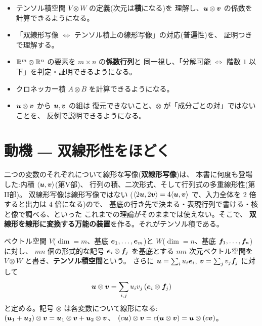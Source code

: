 \begin{goal}
\begin{itemize}
\item テンソル積空間 $V \otimes W$ の定義(次元は\textbf{積}になる)を
理解し、$\bm{u} \otimes \bm{v}$ の係数を計算できるようになる。
\item 「双線形写像 $\iff$ テンソル積上の線形写像」の対応(普遍性)を、
証明つきで理解する。
\item $\mathbb{R}^m \otimes \mathbb{R}^n$ の要素を $m \times n$ の\textbf{係数行列}と
同一視し、「分解可能 $\iff$ 階数 $1$ 以下」を判定・証明できるようになる。
\item クロネッカー積 $A \otimes B$ を計算できるようになる。
\item $\bm{u} \otimes \bm{v}$ から $\bm{u}, \bm{v}$ の組は
復元できないこと、$\otimes$ が「成分ごとの対」ではないことを、
反例で説明できるようになる。
\end{itemize}
\end{goal}

\section{動機 ― 双線形性をほどく}

二つの変数のそれぞれについて線形な写像(\textbf{双線形写像})は、
本書に何度も登場した:内積 $\langle \bm{u}, \bm{v} \rangle$(第V部)、
行列の積、二次形式、そして行列式の多重線形性(第II部)。
双線形写像は線形写像ではない
($\langle 2\bm{u}, 2\bm{v} \rangle = 4\langle \bm{u}, \bm{v} \rangle$
で、入力全体を $2$ 倍すると出力は $4$ 倍になる)ので、
基底の行き先で決まる・表現行列で書ける・核と像で調べる、といった
これまでの理論がそのままでは使えない。そこで、
\textbf{双線形を線形に変換する万能の装置}を作る。それがテンソル積である。

\begin{teigi}[テンソル積]
ベクトル空間 $V$($\dim = m$、基底 $\bm{e}_1, \dots, \bm{e}_m$)と
$W$($\dim = n$、基底 $\bm{f}_1, \dots, \bm{f}_n$)に対し、
$mn$ 個の形式的な記号 $\bm{e}_i \otimes \bm{f}_j$ を基底とする
$mn$ 次元ベクトル空間を $V \otimes W$ と書き、\textbf{テンソル積空間}という。
さらに $\bm{u} = \sum_i u_i \bm{e}_i$, $\bm{v} = \sum_j v_j \bm{f}_j$
に対して
\[
\bm{u} \otimes \bm{v} = \sum_{i, j} u_i v_j\,(\bm{e}_i \otimes \bm{f}_j)
\]
と定める。記号 $\otimes$ は各変数について線形になる:
$(\bm{u}_1 + \bm{u}_2) \otimes \bm{v} = \bm{u}_1 \otimes \bm{v}
+ \bm{u}_2 \otimes \bm{v}$、
$(c\bm{u}) \otimes \bm{v} = c(\bm{u} \otimes \bm{v})
= \bm{u} \otimes (c\bm{v})$。
\end{teigi}

